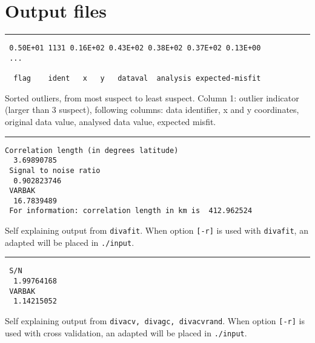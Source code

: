 
\section{Output files}
\begin{multicols}{2}



\begin{minipage}{.5\textwidth}
\rule{\textwidth}{10pt}
{\tiny{
\begin{verbatim}
 0.50E+01 1131 0.16E+02 0.43E+02 0.38E+02 0.37E+02 0.13E+00
 ...
 
  flag    ident   x   y   dataval  analysis expected-misfit
\end{verbatim}
}}
\makebox[\textwidth]{\hrulefill}
{ Sorted outliers, from most suspect to least suspect. Column 1: outlier indicator (larger than 3 suspect), following columns: data identifier, x and y coordinates, original data value, analysed data value, expected misfit.}
\end{minipage}

\begin{minipage}{.5\textwidth}
\rule{\textwidth}{10pt}
{\tiny{
\begin{verbatim}
Correlation length (in degrees latitude)
  3.69890785
 Signal to noise ratio
  0.902823746
 VARBAK
  16.7839489
 For information: correlation length in km is  412.962524
\end{verbatim}
}}
\makebox[\textwidth]{\hrulefill}
{ Self explaining output from {\tt divafit}. When option {\tt [-r]} is used with {\tt divafit}, an adapted  will be placed in {\tt ./input}.}
\end{minipage}

\begin{minipage}{.5\textwidth}
\rule{\textwidth}{10pt}
{\scriptsize{
\begin{verbatim}
 S/N
  1.99764168
 VARBAK
  1.14215052
\end{verbatim}
}}
\makebox[\textwidth]{\hrulefill}
{ Self explaining output from {\tt divacv, divagc, divacvrand}. When option {\tt [-r]} is used with cross validation, an adapted  will be placed in {\tt ./input}}.
\end{minipage}

\end{multicols}
